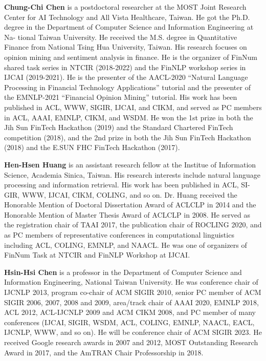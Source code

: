 
\begin{bio}
  {\bfseries Chung-Chi Chen} is a postdoctoral researcher at the MOST Joint Research Center for AI Technology and All Vista Healthcare, Taiwan. He got the Ph.D. degree in the Department of Computer Science and Information Engineering at Na- tional Taiwan University. He received the M.S. degree in Quantitative Finance from National Tsing Hua University, Taiwan. His research focuses on opinion mining and sentiment analysis in finance. He is the organizer of FinNum shared task series in NTCIR (2018-2022) and the FinNLP workshop series in IJCAI (2019-2021). He is the presenter of the AACL-2020 ``Natural Language Processing in Financial Technology Applications''  tutorial and the presenter of the EMNLP-2021 ``Financial Opinion Mining'' tutorial. His work has been published in ACL, WWW, SIGIR, IJCAI, and CIKM, and served as PC members in ACL, AAAI, EMNLP, CIKM, and WSDM. He won the 1st prize in both the Jih Sun FinTech Hackathon (2019) and the Standard Chartered FinTech competition (2018), and the 2nd prize in both the Jih Sun FinTech Hackathon (2018) and the E.SUN FHC FinTech Hackathon (2017).

  {\bfseries Hen-Hsen Huang} is an assistant research fellow at the Institue of Information Science, Academia Sinica, Taiwan. His research interests include natural language processing and information retrieval. His work has been published in ACL, SI- GIR, WWW, IJCAI, CIKM, COLING, and so on. Dr. Huang received the Honorable Mention of Doctoral Dissertation Award of ACLCLP in 2014 and the Honorable Mention of Master Thesis Award of ACLCLP in 2008. He served as the registration chair of TAAI 2017, the publication chair of ROCLING 2020, and as PC members of representative conferences in computational linguistics including ACL, COLING, EMNLP, and NAACL. He was one of organizers of FinNum Task at NTCIR and FinNLP Workshop at IJCAI.

  {\bfseries Hsin-Hsi Chen} is a professor in the Department of Computer Science and Information Engineering, National Taiwan University. He was conference chair of IJCNLP 2013, program co-chair of ACM SIGIR 2010, senior PC member of ACM SIGIR 2006, 2007, 2008 and 2009, area/track chair of AAAI 2020, EMNLP 2018, ACL 2012, ACL-IJCNLP 2009 and ACM CIKM 2008, and PC member of many conferences (IJCAI, SIGIR, WSDM, ACL, COLING, EMNLP, NAACL, EACL, IJCNLP, WWW, and so on). He will be conference chair of ACM SIGIR 2023. He received Google research awards in 2007 and 2012, MOST Outstanding Research Award in 2017, and the AmTRAN Chair Professorship in 2018.

\end{bio}


